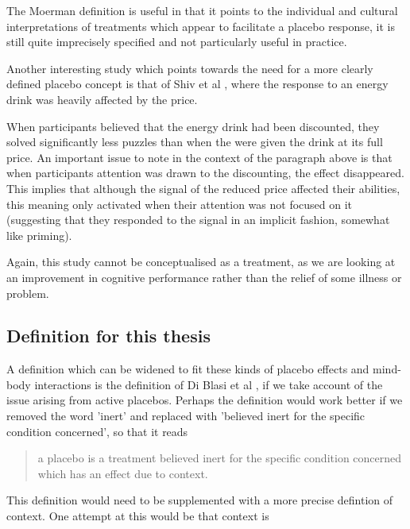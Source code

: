 The Moerman definition is useful in that it points to the individual and cultural interpretations of treatments which appear to facilitate a placebo response, it is still quite imprecisely specified and not particularly useful in practice. %

Another interesting study which points towards the need for a more clearly defined placebo concept is that of Shiv et al \cite{Shiv2005a} , where the response to an energy drink was heavily affected by the price. 

When participants believed that the energy drink had been discounted, they solved significantly less puzzles than when the were given the drink at its full price. An important issue to note in the context of the paragraph above is that when participants attention was drawn to the discounting, the effect disappeared. This implies that although the signal of the reduced price affected their abilities, this meaning only activated when their attention was not focused on it (suggesting that they responded to the signal in an implicit fashion, somewhat like priming). 

Again, this study cannot be conceptualised as a treatment, as we are looking at an improvement in cognitive performance rather than the relief of some illness or problem. 

\subsection{Definition for this thesis}
\label{sec:defin-this-thes}


A definition which can be widened to fit these kinds of placebo effects and mind-body interactions is the definition of Di Blasi et al \cite{Blasi2001}, if we take account of the issue arising from active placebos. Perhaps the definition would work better if we removed the word 'inert' and replaced with 'believed inert for the specific condition concerned', so that it reads

\begin{quotation}
  a placebo is a treatment believed inert for the specific condition
  concerned which has an effect due to context.
\end{quotation}

This definition would need to be supplemented with a more precise defintion of context. One attempt at this would be that context is

